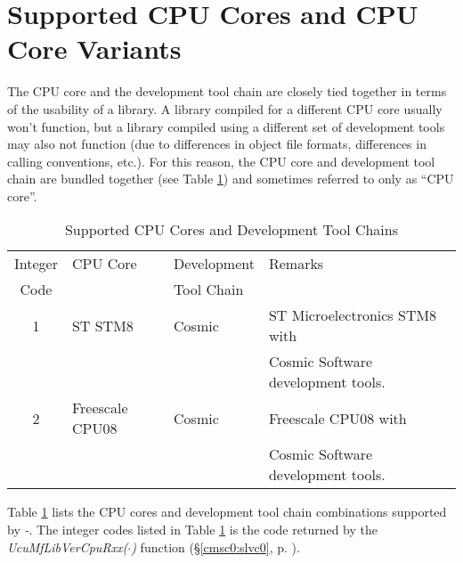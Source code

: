 \section{Supported CPU Cores and CPU Core Variants}
\label{ciov0:sscv0}

The CPU core and the development tool chain are closely tied together in terms
of the usability of a library.  A library compiled for a different CPU core
usually won't function, but a library compiled using a different set of
development tools may also not function (due to differences in object file formats,
differences in calling conventions, etc.).  For this reason,
the CPU core and development tool chain are bundled together (see Table \ref{tbl:ciov0:sscv0:01})
and sometimes referred to only as
``CPU core''.

\begin{table}
\caption{Supported CPU Cores and Development Tool Chains}
\label{tbl:ciov0:sscv0:01}
\begin{center}
\begin{tabular}{|c|l|l|l|}
\hline
Integer & CPU Core          & Development            & Remarks                               \\
Code    &                   & Tool Chain             &                                       \\
\hline
\hline
   1    & ST STM8           & Cosmic                 & ST Microelectronics STM8 with         \\
        &                   &                        & Cosmic Software development tools.    \\
\hline
   2    & Freescale CPU08   & Cosmic                 & Freescale CPU08 with                  \\
        &                   &                        & Cosmic Software development tools.    \\
\hline
\end{tabular}
\end{center}
\end{table}

Table \ref{tbl:ciov0:sscv0:01} lists the CPU cores and development
tool chain combinations supported by
\emph{\productbasenameshort{}-\productversion{}}\@.  The
integer codes listed in Table \ref{tbl:ciov0:sscv0:01}
is the code returned by the
\emph{UcuMfLibVerCpuRxx($\cdot$)}
function (\S{}\ref{cmsc0:slvc0}, p. \pageref{cmsc0:slvc0}).

